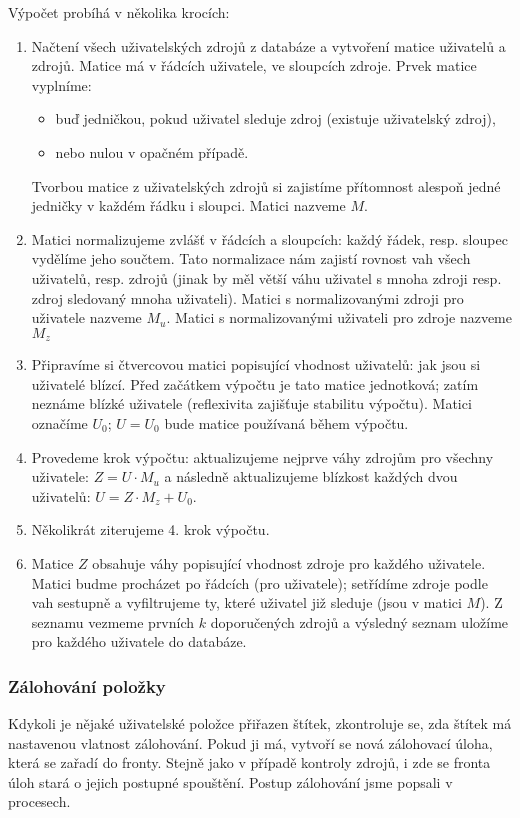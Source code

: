 Výpočet probíhá v několika krocích:
\begin{enumerate}
	\item Načtení všech uživatelských zdrojů z databáze a vytvoření matice uživatelů a zdrojů.
		Matice má v řádcích uživatele, ve sloupcích zdroje.
		Prvek matice vyplníme:
		\begin{itemize}
			\item buď jedničkou, pokud uživatel sleduje zdroj (existuje uživatelský zdroj),
			\item nebo nulou v opačném případě.
		\end{itemize}
		Tvorbou matice z uživatelských zdrojů si zajistíme přítomnost alespoň jedné jedničky v každém řádku i sloupci.
		Matici nazveme $M$.
	\item Matici normalizujeme zvlášť v řádcích a sloupcích: každý řádek, resp. sloupec vydělíme jeho součtem.
		Tato normalizace nám zajistí rovnost vah všech uživatelů, resp. zdrojů (jinak by měl větší váhu uživatel s mnoha zdroji resp. zdroj sledovaný mnoha uživateli).
		Matici s normalizovanými zdroji pro uživatele nazveme $M_u$.
		Matici s normalizovanými uživateli pro zdroje nazveme $M_z$
	\item Připravíme si čtvercovou matici popisující vhodnost uživatelů: jak jsou si uživatelé blízcí.
		Před začátkem výpočtu je tato matice jednotková; zatím neznáme blízké uživatele (reflexivita zajišťuje stabilitu výpočtu).
		Matici označíme $U_0$; $U = U_0$ bude matice používaná během výpočtu.
	\item Provedeme krok výpočtu:
		aktualizujeme nejprve váhy zdrojům pro všechny uživatele:
			$ Z = U \cdot M_u $
		a následně aktualizujeme blízkost každých dvou uživatelů:
			$ U = Z \cdot M_z + U_0 $.
	\item Několikrát ziterujeme 4. krok výpočtu.
	\item Matice $Z$ obsahuje váhy popisující vhodnost zdroje pro každého uživatele.
		Matici budme procházet po řádcích (pro uživatele); setřídíme zdroje podle vah sestupně a vyfiltrujeme ty, které uživatel již sleduje (jsou v matici $M$).
		Z seznamu vezmeme prvních $k$ doporučených zdrojů a výsledný seznam uložíme pro každého uživatele do databáze.
\end{enumerate}

\subsubsection{Zálohování položky}

Kdykoli je nějaké uživatelské položce přiřazen štítek, zkontroluje se, zda štítek má nastavenou vlatnost zálohování.
Pokud ji má, vytvoří se nová zálohovací úloha, která se zařadí do fronty.
Stejně jako v případě kontroly zdrojů, i zde se fronta úloh stará o jejich postupné spouštění.
Postup zálohování jsme popsali v procesech. %

